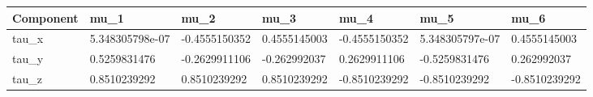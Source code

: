 \begin{tabular}{@{}lllllll@{}}
\toprule
Component & mu\_1 & mu\_2 & mu\_3 & mu\_4 & mu\_5 & mu\_6 \\
\midrule
tau\_x & 5.348305798e-07 & -0.4555150352 & 0.4555145003 & -0.4555150352 & 5.348305797e-07 & 0.4555145003 \\
tau\_y & 0.5259831476 & -0.2629911106 & -0.262992037 & 0.2629911106 & -0.5259831476 & 0.262992037 \\
tau\_z & 0.8510239292 & 0.8510239292 & 0.8510239292 & -0.8510239292 & -0.8510239292 & -0.8510239292 \\
\bottomrule
\end{tabular}
